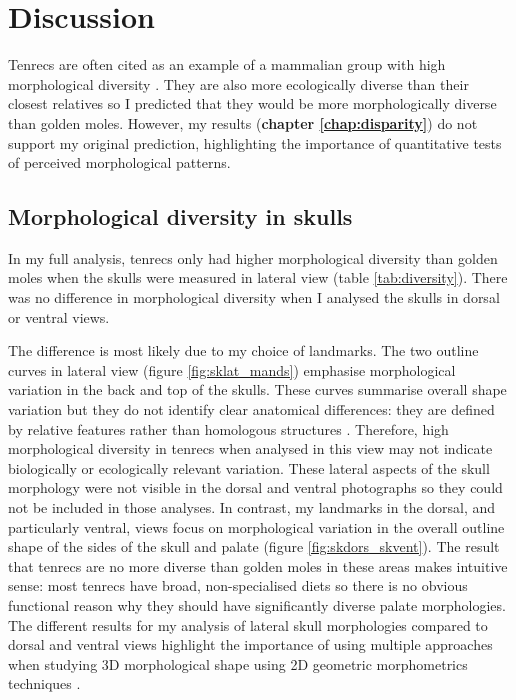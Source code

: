 \chapter{Discussion}
\label{chap:discussion}

\noindent

Tenrecs are often cited as an example of a mammalian group with high morphological diversity \citep{Olson2013, Soarimalala2011, Eisenberg1969}. They are also more ecologically diverse than their closest relatives \citep{Soarimalala2011, Bronner1995} so I predicted that they would be more morphologically diverse than golden moles. However, my results (\textbf{chapter \ref{chap:disparity}}) do not support my original prediction, highlighting the importance of quantitative tests of perceived morphological patterns.

\section{Morphological diversity in skulls}

	In my full analysis, tenrecs only had higher morphological diversity than golden moles when the skulls were measured in lateral view (table \ref{tab:diversity}). There was no difference in morphological diversity when I analysed the skulls in dorsal or ventral views.
	 
	The difference is most likely due to my choice of landmarks. The two outline curves in lateral view (figure \ref{fig:sklat_mands}) emphasise morphological variation in the back and top of the skulls. These curves summarise overall shape variation but they do not identify clear anatomical differences: they are defined by relative features rather than homologous structures \citep{Zelditch2012}. Therefore, high morphological diversity in tenrecs when analysed in this view may not indicate biologically or ecologically relevant variation.	
	These lateral aspects of the skull morphology were not visible in the dorsal and ventral photographs so they could not be included in those analyses. In contrast, my landmarks in the dorsal, and particularly ventral, views focus on morphological variation in the overall outline shape of the sides of the skull and palate (figure \ref{fig:skdors_skvent}). The result that tenrecs are no more diverse than golden moles in these areas makes intuitive sense: most tenrecs have broad, non-specialised diets \citep{Olson2013} so there is no obvious functional reason why they should have significantly diverse palate morphologies.
	The different results for my analysis of lateral skull morphologies compared to dorsal and ventral views highlight the importance of using multiple approaches when studying 3D morphological shape using 2D geometric morphometrics techniques \citep{Arnqvist1998}.

